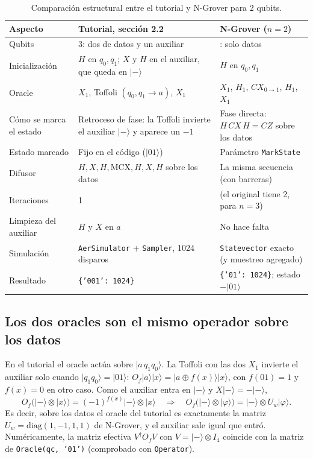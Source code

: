 \documentclass[11pt,a4paper]{article}
\providecommand{\ket}{}\renewcommand{\ket}[1]{\lvert #1\rangle}
\renewcommand{\arraystretch}{1.25}
\begin{document}
\begin{table}[H]
\centering
\small
\renewcommand{\arraystretch}{1.4}
\begin{tabularx}{\textwidth}{@{}>{\raggedright}p{3.0cm}>{\raggedright}X>{\raggedright\arraybackslash}X@{}}
\toprule
Aspecto & Tutorial, sección 2.2 & N-Grover ($n=2$)\\
\midrule
Qubits & 3: dos de datos y un auxiliar & 2: solo datos\\
Inicialización & $H$ en $q_0,q_1$; $X$ y $H$ en el auxiliar, que queda en $\ket-$ & $H$ en $q_0,q_1$\\
Oracle & $X_1$, Toffoli $(q_0,q_1\to a)$, $X_1$ & $X_1$, $H_1$, $CX_{0\to1}$, $H_1$, $X_1$\\
Cómo se marca el estado & Retroceso de fase: la Toffoli invierte el auxiliar $\ket-$ y aparece un $-1$ & Fase directa: $H\,CX\,H=CZ$ sobre los datos\\
Estado marcado & Fijo en el código ($\ket{01}$) & Parámetro \texttt{MarkState}\\
Difusor & $H,X,H,\mathrm{MCX},H,X,H$ sobre los datos & La misma secuencia (con barreras)\\
Iteraciones & 1 & 1 (el original tiene 2, para $n=3$)\\
Limpieza del auxiliar & $H$ y $X$ en $a$ & No hace falta\\
Simulación & \texttt{AerSimulator} + \texttt{Sampler}, 1024 disparos & \texttt{Statevector} exacto (y muestreo agregado)\\
Resultado & \texttt{\{'001': 1024\}} & \texttt{\{'01': 1024\}}; estado $-\ket{01}$\\
\bottomrule
\end{tabularx}
\caption{Comparación estructural entre el tutorial y N-Grover para 2 qubits.}
\label{tab:estructura}
\end{table}

\subsection{Los dos oracles son el mismo operador sobre los datos}

En el tutorial el oracle actúa sobre $\ket{a\,q_1q_0}$. La Toffoli con las dos $X_1$ invierte el auxiliar
solo cuando $\ket{q_1q_0}=\ket{01}$: $O_f\ket{a}\ket{x}=\ket{a\oplus f(x)}\ket{x}$, con $f(01)=1$ y $f(x)=0$ en
otro caso. Como el auxiliar entra en $\ket-$ y $X\ket-=-\ket-$,
\begin{equation}
O_f\big(\ket-\otimes\ket x\big) = (-1)^{f(x)}\ket-\otimes\ket x
\quad\Longrightarrow\quad
O_f\big(\ket-\otimes\ket\varphi\big)=\ket-\otimes U_w\ket\varphi .
\end{equation}
Es decir, sobre los datos el oracle del tutorial es exactamente la matriz $U_w=\mathrm{diag}(1,-1,1,1)$ de N-Grover,
y el auxiliar sale igual que entró. Numéricamente, la matriz efectiva $V^\dagger O_f V$ con
$V=\ket-\otimes I_4$ coincide con la matriz de \texttt{Oracle(qc, '01')} (comprobado con \texttt{Operator}).
\end{document}
